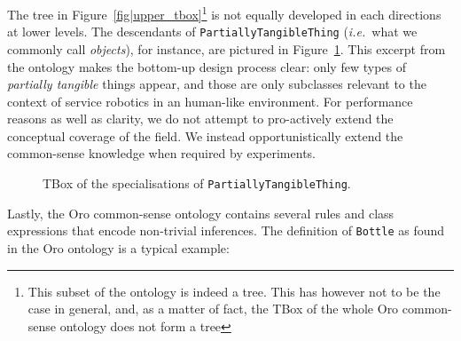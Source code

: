 \documentclass[preprint,3p,times]{elsarticle}
\newcommand{\concept}[1]{{\small \texttt{#1}}}
\newcommand{\ie}{{\textit{i.e.\ }}}
\begin{document}
The tree in Figure~\ref{fig|upper_tbox}\footnote{This subset of the ontology is
indeed a tree. This has however not to be the case in general, and, as a matter
of fact, the TBox of the whole {\sc Oro} common-sense ontology does not form a tree}
is not equally developed in each directions at lower levels. The descendants of
\concept{PartiallyTangibleThing} (\ie what we commonly call \emph{objects}), for
instance, are pictured in Figure~\ref{fig|tangible_things_tbox}. This excerpt
from the ontology makes the bottom-up design process clear: only few types of
\emph{partially tangible} things appear, and those are only subclasses relevant
to the context of service robotics in an human-like environment. For performance
reasons as well as clarity, we do not attempt to pro-actively extend the
conceptual coverage of the field. We instead opportunistically extend the
common-sense knowledge when required by experiments.


\begin{figure}
    \centering

    \caption{TBox of the specialisations of \concept{PartiallyTangibleThing}.}
    \label{fig|tangible_things_tbox}
\end{figure}

Lastly, the {\sc Oro} common-sense ontology contains several rules and class
expressions that encode non-trivial inferences. The definition of
\concept{Bottle} as found in the {\sc Oro} ontology is a typical example:
\end{document}
